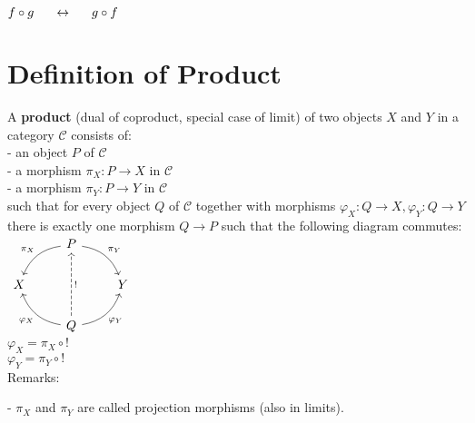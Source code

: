 \documentclass[a4paper, twoside, english, 11pt]{book}
\newcommand{\C}{\mathcal C}
\begin{document}
\noindent
$f \circ g \indent \leftrightarrow \indent g \circ f$



\section{Definition of Product}

A \textbf{product} (dual of coproduct, special case of limit) of two objects $X$ and $Y$ in a category $\C$ consists of: \\

- an object $P$ of $\C$ \\

- a morphism $\pi_X : P \rightarrow X$ in $\C$ \\

- a morphism $\pi_Y : P \rightarrow Y$ in $\C$ \\

\noindent
such that for every object $Q$ of $\C$ together with morphisms $\varphi_X : Q \rightarrow X, \varphi_Y : Q \rightarrow Y$ there is exactly one morphism $Q \rightarrow P$ such that the following diagram commutes: \\

$\begin{tikzcd}
  & P \arrow[rd, "\pi_Y", bend left] \arrow[ld, "\pi_X"', bend right]                                  &   \\
X &                                                                                                    & Y \\
  & Q \arrow[ru, "\varphi_Y"', bend right] \arrow[lu, "\varphi_X", bend left] \arrow[uu, "!"', dashed] &
\end{tikzcd}$ \\

$\varphi_X = \pi_X \circ !$ \\
\indent
$\varphi_Y = \pi_Y \circ !$ \\

\noindent
Remarks:

- $\pi_X$ and $\pi_Y$ are called projection morphisms (also in limits).
\end{document}
